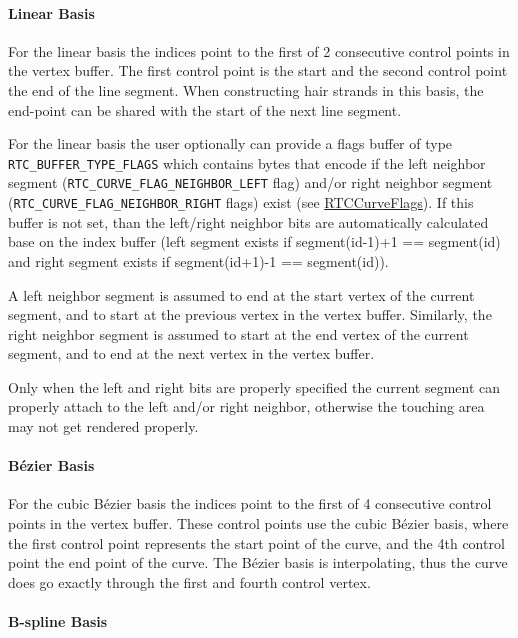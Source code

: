 \paragraph{Linear Basis}\label{linear-basis}

For the linear basis the indices point to the first of 2 consecutive
control points in the vertex buffer. The first control point is the
start and the second control point the end of the line segment. When
constructing hair strands in this basis, the end-point can be shared
with the start of the next line segment.

For the linear basis the user optionally can provide a flags buffer of
type \texttt{RTC\_BUFFER\_TYPE\_FLAGS} which contains bytes that encode
if the left neighbor segment (\texttt{RTC\_CURVE\_FLAG\_NEIGHBOR\_LEFT}
flag) and/or right neighbor segment
(\texttt{RTC\_CURVE\_FLAG\_NEIGHBOR\_RIGHT} flags) exist (see
\hyperref[rtccurveflags]{RTCCurveFlags}). If this buffer is not set,
than the left/right neighbor bits are automatically calculated base on
the index buffer (left segment exists if segment(id-1)+1 == segment(id)
and right segment exists if segment(id+1)-1 == segment(id)).

A left neighbor segment is assumed to end at the start vertex of the
current segment, and to start at the previous vertex in the vertex
buffer. Similarly, the right neighbor segment is assumed to start at the
end vertex of the current segment, and to end at the next vertex in the
vertex buffer.

Only when the left and right bits are properly specified the current
segment can properly attach to the left and/or right neighbor, otherwise
the touching area may not get rendered properly.

\paragraph{Bézier Basis}\label{buxe9zier-basis}

For the cubic Bézier basis the indices point to the first of 4
consecutive control points in the vertex buffer. These control points
use the cubic Bézier basis, where the first control point represents the
start point of the curve, and the 4th control point the end point of the
curve. The Bézier basis is interpolating, thus the curve does go exactly
through the first and fourth control vertex.

\paragraph{B-spline Basis}\label{b-spline-basis}


